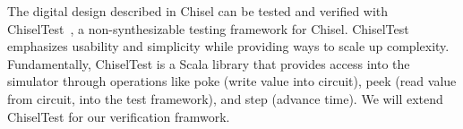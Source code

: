 \documentclass[fleqn,12pt]{article}
\newcommand{\note}[1]{{\it Note: #1}}
\begin{document}
%

The digital design described in Chisel can be tested and verified with
ChiselTest~\cite{chisel:tester2}, a non-synthesizable testing framework for Chisel.
ChiselTest emphasizes usability and simplicity while providing ways to scale up complexity.
Fundamentally, ChiselTest is a Scala library that provides access into the simulator through
operations like poke (write value into circuit), peek (read value from circuit, into the test framework), and step (advance time).
We will extend ChiselTest for our verification framwork.

%
\end{document}
